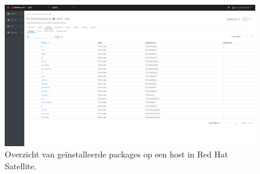 \begin{figure}[h!]
    \includegraphics[width=\textwidth]
    {./graphics/state-of-the-art/rhel-satellite/rhel-sat-host-pkgs.png}
    \caption[Ge\"{i}nstalleerde packages op host in Satellite.]{\label{fig:rhel-sat-host-pkgs}Overzicht van ge\"{i}nstalleerde packages op een host in Red Hat Satellite.}
\end{figure}

